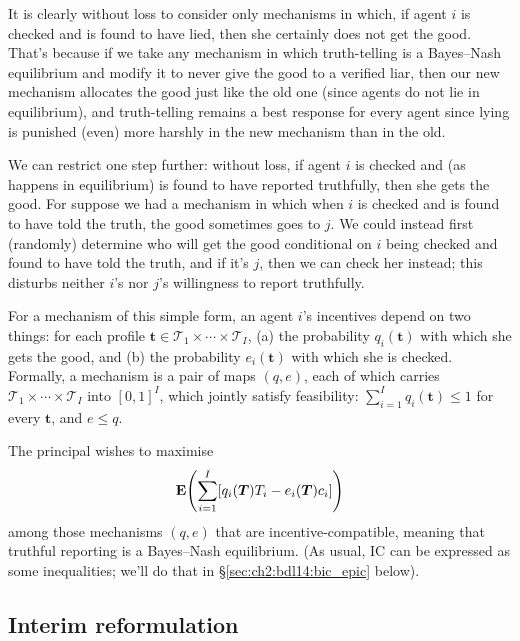 It is clearly without loss to consider only mechanisms in which,
if agent $i$ is checked and is found to have lied, then she certainly does not get the good.
That's because
if we take any mechanism in which truth-telling is a Bayes--Nash equilibrium
and modify it to never give the good to a verified liar,
then our new mechanism allocates the good just like the old one (since agents do not lie in equilibrium),
and truth-telling remains a best response for every agent
since lying is punished (even) more harshly in the new mechanism than in the old.

We can restrict one step further: without loss,
if agent $i$ is checked and (as happens in equilibrium) is found to have reported truthfully, then she gets the good.
For suppose we had a mechanism in which when $i$ is checked and is found to have told the truth, the good sometimes goes to $j$.
We could instead first (randomly) determine who will get the good conditional on $i$ being checked and found to have told the truth, and if it's $j$, then we can check her instead;
this disturbs neither $i$'s nor $j$'s willingness to report truthfully.

For a mechanism of this simple form, an agent $i$'s incentives depend on two things:
for each profile $\boldsymbol{t} \in \mathcal{T}_1 \times \cdots \times \mathcal{T}_I$,
(a) the probability $q_i(\boldsymbol{t})$ with which she gets the good, and
(b) the probability $e_i(\boldsymbol{t})$ with which she is checked.
Formally, a mechanism is a pair of maps $(q,e)$, each of which carries $\mathcal{T}_1 \times \cdots \times \mathcal{T}_I$ into $[0,1]^I$, which jointly satisfy feasibility:
$\sum_{i=1}^I q_i(\boldsymbol{t}) \leq 1$ for every $\boldsymbol{t}$,
and $e \leq q$.


The principal wishes to maximise
%
\begin{equation*}
	\E\left(
	\sum_{i=1}^I 
	\left[
	q_i(\boldsymbol{T}) T_i - e_i(\boldsymbol{T}) c_i
	\right]
	\right)
\end{equation*}
%
among those mechanisms $(q,e)$ that are incentive-compatible,
meaning that truthful reporting is a Bayes--Nash equilibrium.
(As usual, IC can be expressed as some inequalities;
we'll do that in §\ref{sec:ch2:bdl14:bic_epic} below).



\subsection{Interim reformulation}
\label{sec:ch2:bdl14:interim}

